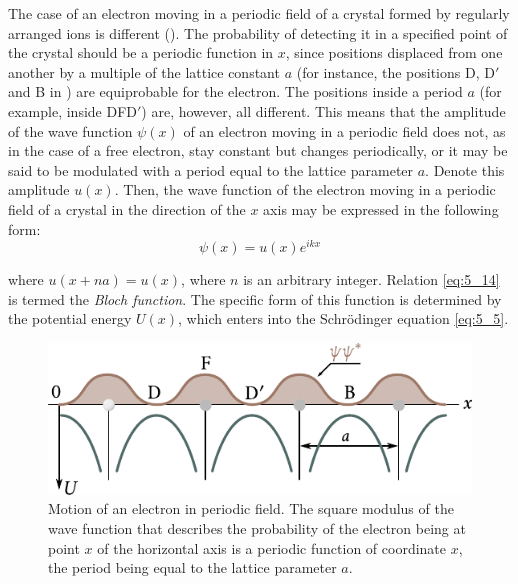 The case of an electron moving in a periodic field of a crystal formed by regularly arranged ions is different (). The probability of detecting it in a specified point of the crystal should be a periodic function in $x$, since positions displaced from one another by a multiple of the lattice constant $a$ (for instance, the positions D, D$'$ and B in ) are equiprobable for the electron. The positions inside a period $a$ (for example, inside DFD$'$) are, however, all different. This means that the amplitude of the wave function $\psi(x)$ of an electron moving in a periodic field does not, as in the case of a free electron, stay constant but changes periodically, or it may be said to be modulated with a period equal to the lattice parameter $a$. Denote this amplitude $u(x)$. Then, the wave function of the electron moving in a periodic field of a crystal in the direction of the $x$
axis may be expressed in the following form:
\begin{equation}\label{eq:5_14}
    \psi(x) = u(x) e^{ikx}
\end{equation}

\noindent
where $u(x+na)=u(x)$, where $n$ is an arbitrary integer. Relation \eqref{eq:5_14} is termed the \textit{Bloch function}. The specific form of this function is determined by the potential energy $U(x)$, which enters into the Schr\"odinger equation \eqref{eq:5_5}.

\begin{figure}[t]
	\begin{center}
		\includegraphics[scale=1]{figures/ch_05/fig_5_9.pdf}
		\caption[]{Motion of an electron in periodic field. The square modulus of the wave function that describes the probability of the electron being at point $x$ of the horizontal axis is a periodic function of coordinate $x$, the period being equal to the lattice parameter $a$.}
		\label{fig:5_9}
	\end{center}
	\vspace{-0.7cm}
\end{figure}

